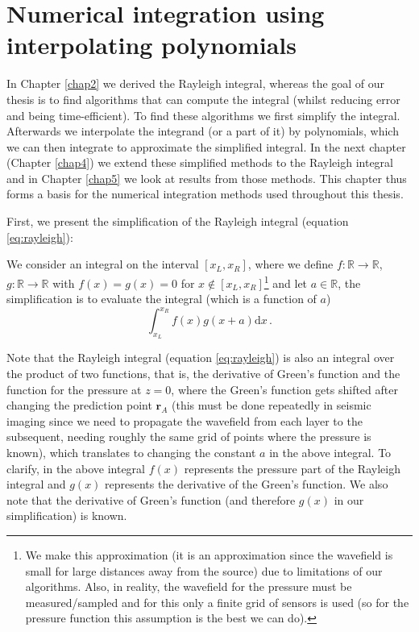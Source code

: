 \chapter{Numerical integration using interpolating polynomials}
\label{chap3}
In Chapter \ref{chap2} we derived the Rayleigh integral, whereas the goal of our thesis is to find algorithms that can compute the integral (whilst reducing error and being time-efficient).
To find these algorithms we first simplify the integral.
Afterwards we interpolate the integrand (or a part of it) by polynomials, which we can then integrate to approximate the simplified integral.
In the next chapter (Chapter \ref{chap4}) we extend these simplified methods to the Rayleigh integral and in Chapter \ref{chap5} we look at results from those methods.
This chapter thus forms a basis for the numerical integration methods used throughout this thesis.

First, we present the simplification of the Rayleigh integral (equation \ref{eq:rayleigh}):
\begin{tcolorbox}[sharp corners, colback=white]
    We consider an integral on the interval $[x_L, x_R]$, where we define $f: \mathbb R \to \mathbb R$, $g: \mathbb R \to \mathbb R$ with $f(x)=g(x)=0$ for $x\notin [x_L, x_R]$\footnote{We make this approximation (it is an approximation since the wavefield is small for large distances away from the source) due to limitations of our algorithms. Also, in reality, the wavefield for the pressure must be measured/sampled and for this only a finite grid of sensors is used (so for the pressure function this assumption is the best we can do).}
    and let $a \in \mathbb R$, the simplification is to evaluate the integral (which is a function of $a$)
    \vspace{-1em}
    \begin{equation}
        \int_{x_L}^{x_R} f(x) g(x+a) \mathrm d x \,. \label{eq:definite_int}
    \end{equation}
\end{tcolorbox}
Note that the Rayleigh integral (equation \ref{eq:rayleigh}) is also an integral over the product of two functions, that is, the derivative of Green's function and the function for the pressure at $z=0$, where the Green's function gets shifted after changing the prediction point $\mathbf r_A$ (this must be done repeatedly in seismic imaging since we need to propagate the wavefield from each layer to the subsequent, needing roughly the same grid of points where the pressure is known), which translates to changing the constant $a$ in the above integral.
To clarify, in the above integral $f(x)$ represents the pressure part of the Rayleigh integral and $g(x)$ represents the derivative of the Green's function.
We also note that the derivative of Green's function (and therefore $g(x)$ in our simplification) is known.


